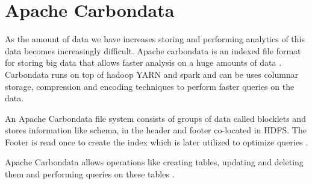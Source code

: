 \section{Apache Carbondata}

As the amount of data we have increases storing and performing
analytics of this data becomes increasingly difficult.
Apache carbondata is an indexed file format for storing big data
that allows faster analysis on a huge amounts of data
\cite{hid-sp18-503-carbondata-docs}. Carbondata runs on top of hadoop YARN
and spark and can be uses columnar storage, compression and
encoding techniques to perform faster queries on the data.

An Apache Carbondata file system consists of groups of data called blocklets
and stores information like schema, in the header and footer co-located in HDFS.
The Footer is read once to create the index which is later utilized to
optimize queries \cite{hid-sp18-503-carbondata-docs}.

Apache Carbondata allows operations like creating tables, updating and
deleting them and performing queries on these tables
\cite{hid-sp18-503-carbondata-mgmt}.



